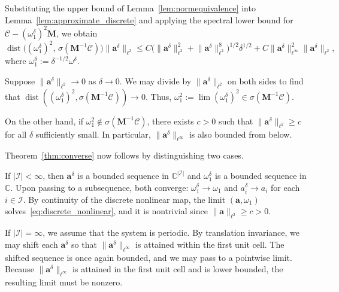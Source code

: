 \documentclass[a4paper,reqno,twoside]{amsart}
\numberwithin{equation}{section}
\theoremstyle{definition}
\newcommand{\<}{\ensuremath \leq}
\renewcommand{\>}{\ensuremath \geq}
\begin{document}
Substituting the upper bound of Lemma~\ref{lem:normequivalence} into
Lemma~\ref{lem:approximate_discrete} and applying the spectral lower
bound for $\mathcal{C} - (\omega_1^\delta)^2\mathbf{M}$, we obtain
\begin{equation}\label{eq:key_lower}
    \operatorname{dist}\bigl((\omega_1^\delta)^2,\,
      \sigma(\mathbf{M}^{-1}\mathcal{C})\bigr)
    \lVert \mathbf{a}^\delta \rVert_{\ell^2}
    \leq C \bigl(
      \lVert \mathbf{a}^\delta \rVert_{\ell^2}^2
      + \lVert \mathbf{a}^\delta \rVert_{\ell^2}^8
    \bigr)^{1/2} \delta^{1/2}
    + C \lVert \mathbf{a}^\delta \rVert_{\ell^\infty}^2
      \lVert \mathbf{a}^\delta \rVert_{\ell^2},
\end{equation}
where $\omega_1^\delta := \delta^{-1/2}\omega^\delta$.

Suppose $\lVert \mathbf{a}^\delta \rVert_{\ell^2} \to 0$ as
$\delta \to 0$. We may divide by $\lVert \mathbf{a}^\delta \rVert_{\ell^2}$ on both sides to find that $\operatorname{dist}((\omega_1^\delta)^2,
\sigma(\mathbf{M}^{-1}\mathcal{C})) \to 0$. Thus, $\omega_1^2 := \lim (\omega_1^\delta)^2
\in \sigma(\mathbf{M}^{-1}\mathcal{C})$.

On the other hand, if 
$\omega_1^2 \notin \sigma(\mathbf{M}^{-1}\mathcal{C})$,
there exists $c > 0$ such that
$\lVert \mathbf{a}^\delta \rVert_{\ell^2} \geq c$ for all $\delta$
sufficiently small. In particular,
$\lVert \mathbf{a}^\delta \rVert_{\ell^\infty}$ is also bounded from below.

Theorem~\ref{thm:converse} now follows by distinguishing two cases.

If $|\mathcal{I}| < \infty$, then $\mathbf{a}^\delta$ is a bounded
sequence in $\mathbb{C}^{|\mathcal{I}|}$ and $\omega_1^\delta$ is a
bounded sequence in $\mathbb{C}$. Upon passing to a subsequence, both
converge: $\omega_1^\delta \to \omega_1$ and
$a_i^\delta \to a_i$ for each $i \in \mathcal{I}$.
By continuity of the discrete nonlinear map, the limit
$(\mathbf{a}, \omega_1)$ solves~\eqref{eq:discrete_nonlinear}, and it
is nontrivial since $\lVert \mathbf{a} \rVert_{\ell^2} \geq c > 0$.

If $|\mathcal{I}| = \infty$, we assume that the system is periodic. By
translation invariance, we may shift each $\mathbf{a}^\delta$ so that
$\lVert \mathbf{a}^\delta \rVert_{\ell^\infty}$ is attained within
the first unit cell. The shifted sequence is once again bounded, and we may pass to a pointwise limit. Because $\lVert \mathbf{a}^\delta \rVert_{\ell^\infty}$ is attained in the first unit cell and is lower bounded, the resulting limit must be nonzero.
\end{document}
